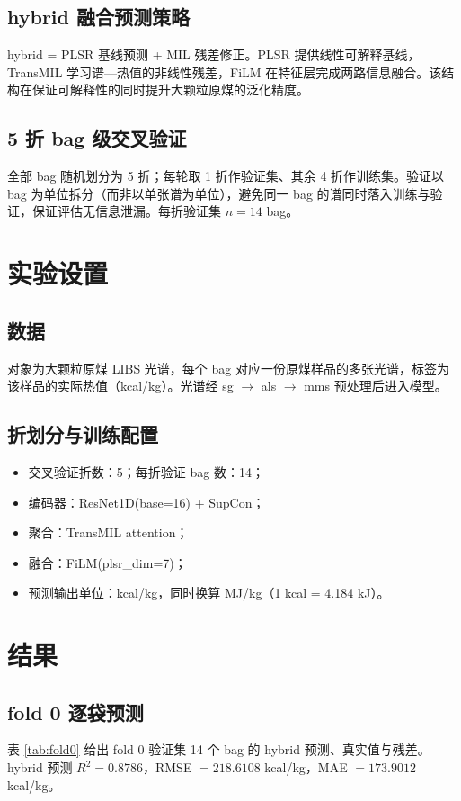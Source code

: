 \documentclass[11pt,a4paper]{ctexart}
\begin{document}
\subsection{hybrid 融合预测策略}
hybrid = PLSR 基线预测 + MIL 残差修正。PLSR 提供线性可解释基线，TransMIL 学习谱—热值的非线性残差，FiLM 在特征层完成两路信息融合。该结构在保证可解释性的同时提升大颗粒原煤的泛化精度。

\subsection{5 折 bag 级交叉验证}
全部 bag 随机划分为 5 折；每轮取 1 折作验证集、其余 4 折作训练集。验证以 bag 为单位拆分（而非以单张谱为单位），避免同一 bag 的谱同时落入训练与验证，保证评估无信息泄漏。每折验证集 $n = 14$ bag。

\section{实验设置}
\subsection{数据}
对象为大颗粒原煤 LIBS 光谱，每个 bag 对应一份原煤样品的多张光谱，标签为该样品的实际热值（kcal/kg）。光谱经 sg $\rightarrow$ als $\rightarrow$ mms 预处理后进入模型。

\subsection{折划分与训练配置}
\begin{itemize}
  \item 交叉验证折数：5；每折验证 bag 数：14；
  \item 编码器：ResNet1D(base=16) + SupCon；
  \item 聚合：TransMIL attention；
  \item 融合：FiLM(plsr\_dim=7)；
  \item 预测输出单位：kcal/kg，同时换算 MJ/kg（1 kcal = 4.184 kJ）。
\end{itemize}

\section{结果}
\subsection{fold 0 逐袋预测}
表 \ref{tab:fold0} 给出 fold 0 验证集 14 个 bag 的 hybrid 预测、真实值与残差。hybrid 预测 $R^2 = 0.8786$，RMSE $= 218.6108$ kcal/kg，MAE $= 173.9012$ kcal/kg。
\end{document}
